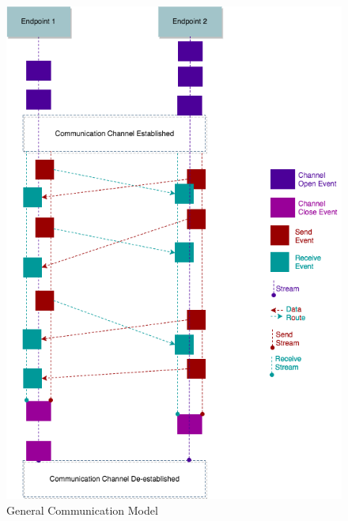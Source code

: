 \begin{figure}[H]
\centerline{\includegraphics[scale=0.55]{Figures/communicationdefinition}}
 \caption{General Communication Model}
\label{communicationhappen}
\end{figure}



